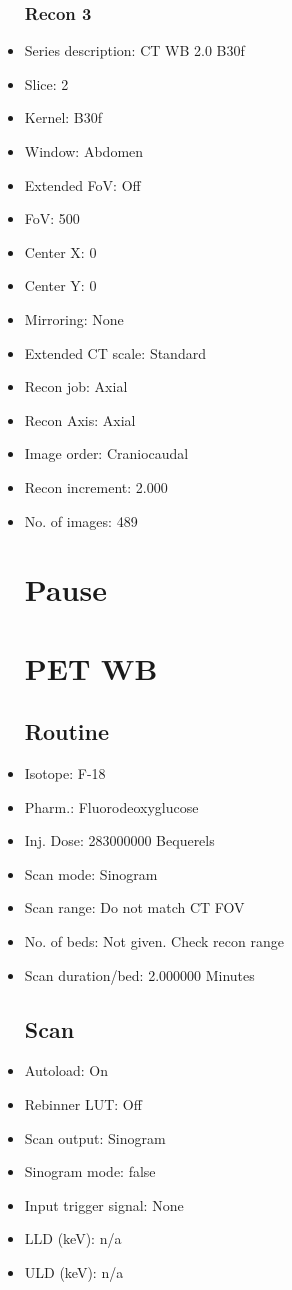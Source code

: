 \documentclass[12pt]{article}
\begin{document}
\begin{itemize}
\subsubsection{Recon 3}
\item Series description: CT WB 2.0 B30f
\item Slice: 2
\item Kernel: B30f
\item Window: Abdomen
\item Extended FoV: Off
\item FoV: 500
\item Center X: 0
\item Center Y: 0
\item Mirroring: None
\item Extended CT scale: Standard
\item Recon job: Axial
\item Recon Axis: Axial
\item Image order: Craniocaudal
\item Recon increment: 2.000
\item No. of images: 489
\section{Pause}
\section{PET WB}\subsection{Routine}
\item Isotope: F-18
\item Pharm.: Fluorodeoxyglucose
\item Inj. Dose: 283000000 Bequerels
\item Scan mode: Sinogram
\item Scan range: Do not match CT FOV
\item No. of beds: Not given. Check recon range
\item Scan duration/bed: 2.000000 Minutes
\subsection{Scan}
\item Autoload: On
\item Rebinner LUT: Off
\item Scan output: Sinogram
\item Sinogram mode: false
\item Input trigger signal: None
\item LLD (keV): n/a
\item ULD (keV): n/a

\end{itemize}
\end{document}
